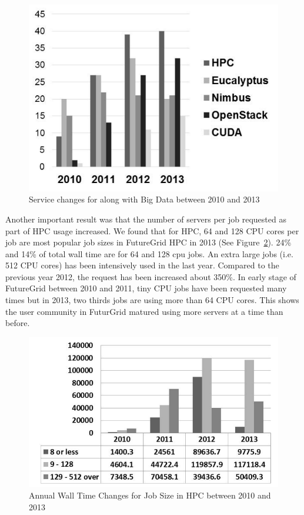 \documentclass{sig-alternate-05-2015}
\begin{document}
\begin{figure}[htb]
  \centering
    \includegraphics[width=1.0\columnwidth]{images/bigdata.pdf} 
  \caption{Service changes for along with Big Data between 2010 and 2013}\label{F:bigdata} 
\end{figure} 

Another important result was that the number of servers per job
requested as part of HPC usage increased. We found that for HPC, 64
and 128 CPU cores per job are most popular job sizes in FutureGrid HPC
in 2013 (See Figure~\ref{F:bigdatainhpc}). 24\% and 14\% of total wall
time are for 64 and 128 cpu jobs. An extra large jobs (i.e. 512 CPU
cores) has been intensively used in the last year. Compared to the
previous year 2012, the request has been increased about 350\%. In
early stage of FutureGrid between 2010 and 2011, tiny CPU jobs have
been requested many times but in 2013, two thirds jobs are using more
than 64 CPU cores. This shows the user community in FuturGrid
matured using more servers at a time than before.

\begin{figure}[htb]
  \centering
    \includegraphics[width=1.0\columnwidth]{images/bigdatainhpc.pdf} 
  \caption{Annual Wall Time Changes for Job Size in HPC between 2010 and 2013}\label{F:bigdatainhpc} 
\end{figure} 
\end{document}

